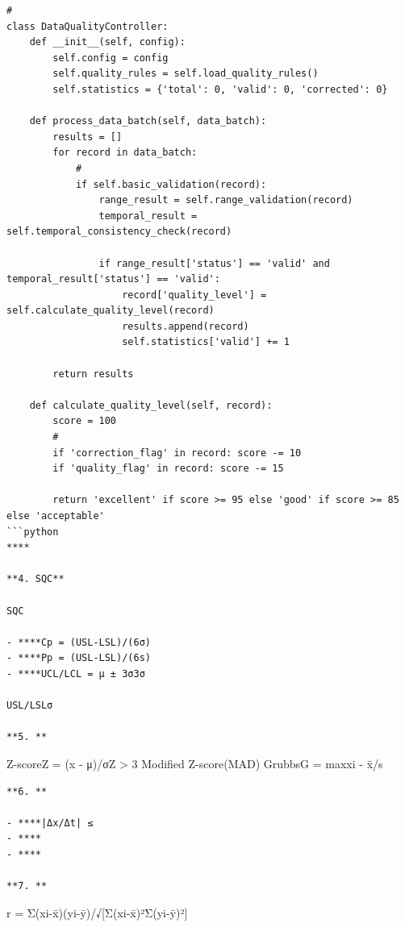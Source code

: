 \begin{verbatim}
# 
class DataQualityController:
    def __init__(self, config):
        self.config = config
        self.quality_rules = self.load_quality_rules()
        self.statistics = {'total': 0, 'valid': 0, 'corrected': 0}
        
    def process_data_batch(self, data_batch):
        results = []
        for record in data_batch:
            # 
            if self.basic_validation(record):
                range_result = self.range_validation(record)
                temporal_result = self.temporal_consistency_check(record)
                
                if range_result['status'] == 'valid' and temporal_result['status'] == 'valid':
                    record['quality_level'] = self.calculate_quality_level(record)
                    results.append(record)
                    self.statistics['valid'] += 1
            
        return results
    
    def calculate_quality_level(self, record):
        score = 100
        # 
        if 'correction_flag' in record: score -= 10
        if 'quality_flag' in record: score -= 15
        
        return 'excellent' if score >= 95 else 'good' if score >= 85 else 'acceptable'
```python
****

**4. SQC**

SQC

- ****Cp = (USL-LSL)/(6σ)
- ****Pp = (USL-LSL)/(6s)
- ****UCL/LCL = μ ± 3σ3σ

USL/LSLσ

**5. **
\end{verbatim}

Z-scoreZ = (x - μ)/σ\textbar Z\textbar{} \textgreater{} 3 Modified
Z-score(MAD) GrubbsG = max\textbar xi - x̄\textbar/s

\begin{verbatim}
**6. **

- ****|Δx/Δt| ≤ 
- ****
- ****

**7. **
\end{verbatim}

r = Σ(xi-x̄)(yi-ȳ)/√{[}Σ(xi-x̄)²Σ(yi-ȳ)²{]}

